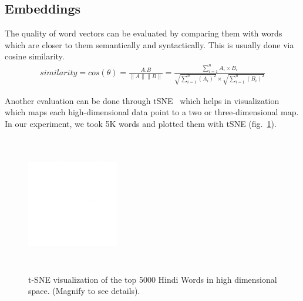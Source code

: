 \documentclass[11pt,a4paper]{article}
\begin{document}
\subsection{Embeddings}
The quality of word vectors can be evaluated by comparing them with words which are closer to them semantically and syntactically. This is usually done via cosine similarity.
\begin{align}
similarity=cos(\theta)=\frac{A.B}{\|A\|\|B\|}=\frac{\sum_{i=1}^{n}A_i \times B_i}{\sqrt{\sum_{i=1}^{n}(A_i)^2}\times \sqrt{\sum_{i=1}^{n}(B_i)^2}}
\end{align}

Another evaluation can be done through tSNE~\cite{Maaten:08} which helps in visualization which maps each high-dimensional data point to a two or three-dimensional map. In our experiment, we took 5K words and plotted
them with tSNE (fig.~\ref{fig:5K_hindi}). 

\begin{figure}[H]
\centering
\includegraphics[width=40mm, height=60mm]{img/tsne.eps}
\caption{t-SNE visualization of the top 5000 Hindi Words in high dimensional space.  (Magnify to see details). \label{fig:5K_hindi}}
\end{figure}

\end{document}

